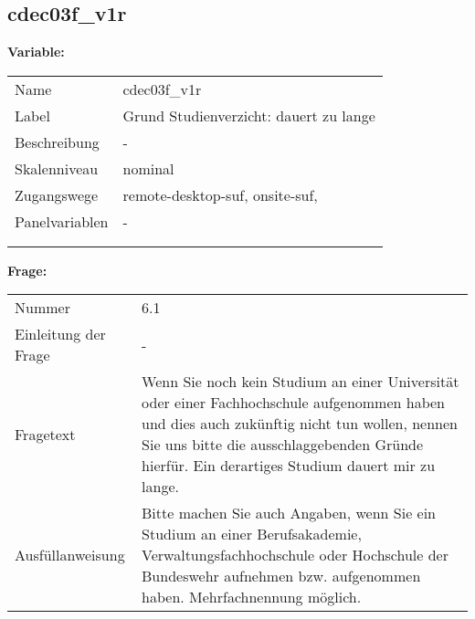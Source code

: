 	
	
	\subsection{cdec03f\_v1r}
	\label{subSection:cdec03f_v1r}

	\noindent\textbf{Variable:}\\
		\begin{tabular}{lL{11.3cm}}
			\label{tableVariable:cdec03f_v1r}
			Name & cdec03f\_v1r \\
			Label & Grund Studienverzicht: dauert zu lange \\
			Beschreibung & - \\
			Skalenniveau & nominal \\
			Zugangswege &
				remote-desktop-suf,
				onsite-suf,
 \\
			Panelvariablen & -
			 \\
			 \\
 \\
		\end{tabular}

		\vspace*{1 cm}
		\noindent\textbf{Frage:}\\
		\begin{tabular}{lL{11.3cm}}
			\label{tableQuestion:cdec03f_v1r}
			Nummer & 6.1 \\
			Einleitung der Frage & - \\
			Fragetext & Wenn Sie noch kein Studium an einer Universität oder einer Fachhochschule aufgenommen haben und dies auch zukünftig nicht tun wollen, nennen Sie uns bitte die ausschlaggebenden Gründe hierfür.
Ein derartiges Studium dauert mir zu lange. \\
			Ausfüllanweisung & Bitte machen Sie auch Angaben, wenn Sie ein Studium an einer Berufsakademie, Verwaltungsfachhochschule oder Hochschule der Bundeswehr aufnehmen bzw. aufgenommen haben. Mehrfachnennung möglich. \\
		\end{tabular}





